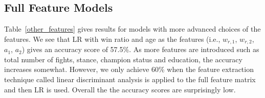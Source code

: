 \clearpage
\subsection*{Full Feature Models}

Table~\ref{other_features} gives results for models with more
advanced choices of the features. We see that LR with win ratio
and age as the features (i.e., $w_{r,1}$, $w_{r,2}$, $a_1$, $a_2$) gives an
accuracy score of 57.5\%. As more features are introduced such as
total number of fights, stance, champion status and education, the
accuracy increases somewhat. However, we only achieve 60\% when the feature
extraction technique called linear discriminant analysis is applied
to the full feature matrix and then LR is used. Overall the the accuracy
scores are surprisingly low.

